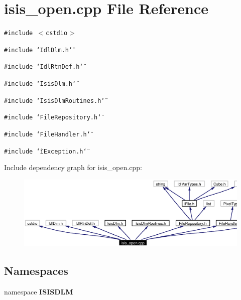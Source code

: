 \section{isis\_\-open.cpp File Reference}
\label{isis__open_8cpp}
{\tt \#include $<$cstdio$>$}\par
{\tt \#include \char`\"{}Idl\-Dlm.h\char`\"{}}\par
{\tt \#include \char`\"{}Idl\-Rtn\-Def.h\char`\"{}}\par
{\tt \#include \char`\"{}Isis\-Dlm.h\char`\"{}}\par
{\tt \#include \char`\"{}Isis\-Dlm\-Routines.h\char`\"{}}\par
{\tt \#include \char`\"{}File\-Repository.h\char`\"{}}\par
{\tt \#include \char`\"{}File\-Handler.h\char`\"{}}\par
{\tt \#include \char`\"{}i\-Exception.h\char`\"{}}\par


Include dependency graph for isis\_\-open.cpp:\begin{figure}[H]
\begin{center}
\leavevmode
\includegraphics[width=351pt]{isis__open_8cpp__incl}
\end{center}
\end{figure}
\subsection*{Namespaces}
\begin{CompactItemize}
\item 
namespace {\bf ISISDLM}
\end{CompactItemize}
